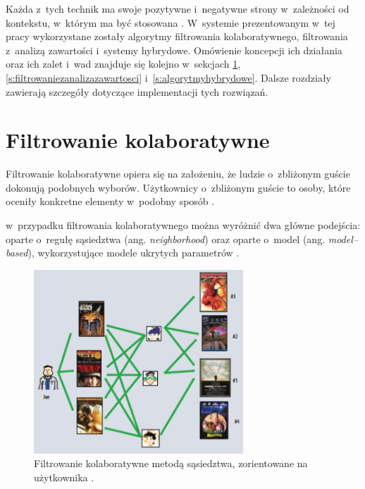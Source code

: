 \documentclass[twoside]{iisthesis}
\begin{document}
	 Każda z~tych technik ma swoje pozytywne i~negatywne strony w~zależności od kontekstu, w~którym ma być stosowana \cite{id:IntroductionToRecommenderSystemsHandbook}. W~systemie prezentowanym w~tej pracy wykorzystane zostały algorytmy filtrowania kolaboratywnego, filtrowania z~analizą zawartości i~systemy hybrydowe. Omówienie koncepcji ich działania oraz ich zalet i~wad znajduje się kolejno w~sekcjach \ref{s:filtrowaniekolaboratywne}, \ref{s:filtrowaniezanalizazawartosci} i~\ref{s:algorytmyhybrydowe}. Dalsze rozdziały zawierają szczegóły dotyczące implementacji tych rozwiązań.
	 
	  \section{Filtrowanie kolaboratywne}
	  \label{s:filtrowaniekolaboratywne}
	  
	  Filtrowanie kolaboratywne opiera się na założeniu, że ludzie o~zbliżonym guście dokonują podobnych wyborów. Użytkownicy o~zbliżonym guście to osoby, które oceniły konkretne elementy w~podobny sposób \cite{id:IntroductionToRecommenderSystemsHandbook, id:CollaborativeFilteringRecommenderSystems, id:huynh2012modeling}. 
	  
	  w~przypadku filtrowania kolaboratywnego można wyróżnić dwa główne podejścia: oparte o~regułę sąsiedztwa (ang. \textit{neighborhood}) oraz oparte o~model (ang. \textit{model--based}), wykorzystujące modele ukrytych parametrów \cite{id:AdvancesInCollaborativeFiltering,koren2009matrix}. 
	  
	  \begin{figure}[!ht] 
	  	\centering
	  	\includegraphics[width=0.7\textwidth]{cf}
	  	\caption{Filtrowanie kolaboratywne metodą sąsiedztwa,  zorientowane na użytkownika \protect\cite{koren2009matrix}.}
	  	\label{fig:cf}
	  \end{figure}
	  
\end{document}

